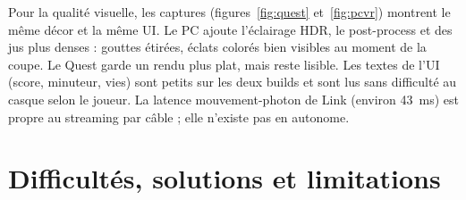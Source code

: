 \documentclass[11pt,a4paper]{article}
\begin{document}
Pour la qualité visuelle, les captures (figures~\ref{fig:quest} et~\ref{fig:pcvr}) montrent le même
décor et la même UI. Le PC ajoute l'éclairage HDR, le post-process et des jus plus denses : gouttes
étirées, éclats colorés bien visibles au moment de la coupe. Le Quest garde un rendu plus plat, mais
reste lisible. Les textes de l'UI (score, minuteur, vies) sont petits sur les deux builds et sont lus
sans difficulté au casque selon le joueur. La latence mouvement-photon de Link (environ 43~ms) est
propre au streaming par câble ; elle n'existe pas en autonome.

\section{Difficultés, solutions et limitations}
\label{sec:difficultes}
\end{document}
